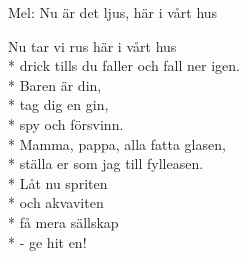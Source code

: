 \begin{SongText}
    \begin{SongInfo}
        Mel: Nu är det ljus, här i vårt hus
    \end{SongInfo}
    \begin{SongVerse}
        Nu tar vi rus här i vårt hus\\*%
        drick tills du faller och fall ner igen.\\*%
        Baren är din,\\*%
        tag dig en gin,\\*%
        spy och försvinn.\\*%
        Mamma, pappa, alla fatta glasen,\\*%
        ställa er som jag till fylleasen.\\*%
        Låt nu spriten\\*%
        och akvaviten\\*%
        få mera sällskap\\*%
        - ge hit en!
    \end{SongVerse}
\end{SongText}
